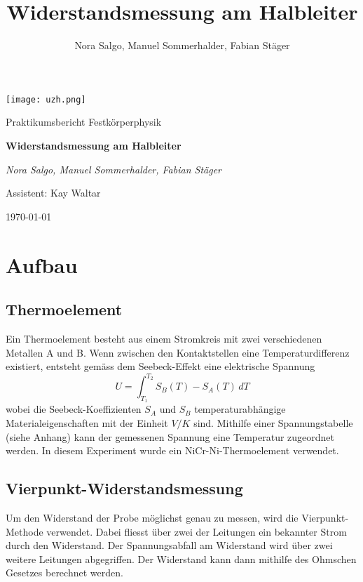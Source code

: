 \documentclass[a4paper]{scrartcl}
\title{Widerstandsmessung am Halbleiter}
\author{Nora Salgo, Manuel Sommerhalder, Fabian Stäger}
\begin{document}
\begin{titlepage}
	\centering
	\texttt{[image: uzh.png]}\par\vspace{1cm}
	\vspace{1cm}
	{\Large Praktikumsbericht Festkörperphysik\par}
	\vspace{1.5cm}
	{\huge\bfseries Widerstandsmessung am Halbleiter\par}
	\vspace{2cm}
	{\Large\itshape Nora Salgo, Manuel Sommerhalder, Fabian Stäger \par\vspace{1cm}
	Assistent: Kay Waltar}
	\vfill
	

	\vfill

	{\large \today\par}
\end{titlepage}

\section{Aufbau}

\subsection{Thermoelement}
Ein Thermoelement besteht aus einem Stromkreis mit zwei verschiedenen Metallen A und B. Wenn zwischen den Kontaktstellen eine Temperaturdifferenz existiert, entsteht gemäss dem Seebeck-Effekt eine elektrische Spannung 
$$ U = \int_{T_{1}}^{T_{2}} S_{B}(T) - S_{A}(T) \, dT $$
wobei die Seebeck-Koeffizienten $S_{A}$ und $S_{B}$ temperaturabhängige Materialeigenschaften mit der Einheit $V/K$ sind. Mithilfe einer Spannungstabelle (siehe Anhang) kann der gemessenen Spannung eine Temperatur zugeordnet werden. In diesem Experiment wurde ein NiCr-Ni-Thermoelement verwendet.

\subsection{Vierpunkt-Widerstandsmessung}
Um den Widerstand der Probe möglichst genau zu messen, wird die Vierpunkt-Methode verwendet. Dabei fliesst über zwei der Leitungen ein bekannter Strom durch den Widerstand. Der Spannungsabfall am Widerstand wird über zwei weitere Leitungen abgegriffen. Der Widerstand kann dann mithilfe des Ohmschen Gesetzes berechnet werden.


\newpage
\end{document}
